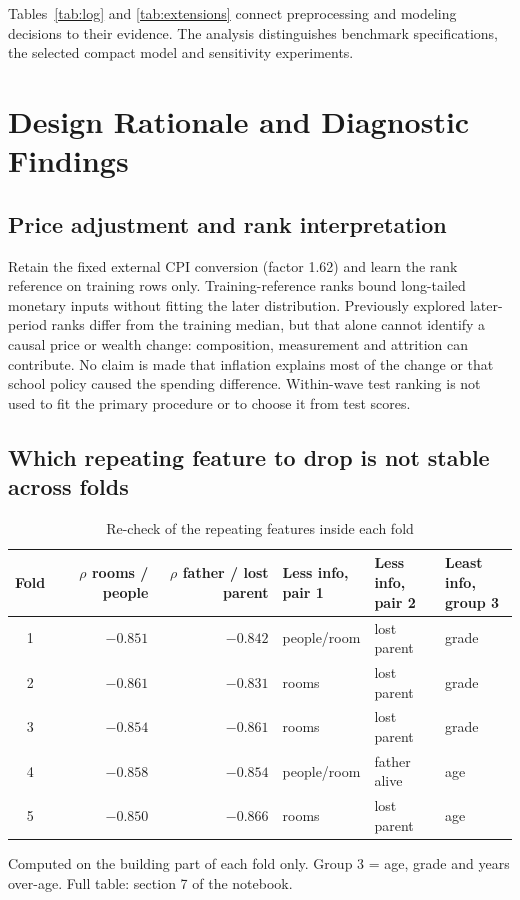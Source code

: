 \documentclass[conference,a4paper]{IEEEtran}
\newcommand{\tabnote}[1]{\par\vspace{3pt}\begin{minipage}{\linewidth}\footnotesize\raggedright #1\end{minipage}}
\begin{document}
Tables~\ref{tab:log} and \ref{tab:extensions} connect preprocessing and modeling decisions to their evidence. The analysis distinguishes benchmark specifications, the selected compact model and sensitivity experiments.

\section{\textbf{Design Rationale and Diagnostic Findings}}
\subsection{\textbf{Price adjustment and rank interpretation}}
Retain the fixed external CPI conversion (factor 1.62) and learn the rank reference on training rows only. Training-reference ranks bound long-tailed monetary inputs without fitting the later distribution. Previously explored later-period ranks differ from the training median, but that alone cannot identify a causal price or wealth change: composition, measurement and attrition can contribute. No claim is made that inflation explains most of the change or that school policy caused the spending difference. Within-wave test ranking is not used to fit the primary procedure or to choose it from test scores.

\subsection{\textbf{Which repeating feature to drop is not stable across folds}}
\begin{table}[!t]
\centering
\caption{Re-check of the repeating features inside each fold}
\label{tab:folds}
\footnotesize
\setlength{\tabcolsep}{3pt}
\begin{tabular}{crrlll}
\toprule
Fold & \makecell{$\rho$ rooms /\\people} & \makecell{$\rho$ father /\\lost parent} & \makecell[l]{Less info,\\pair 1} & \makecell[l]{Less info,\\pair 2} & \makecell[l]{Least info,\\group 3} \\
\midrule
1 & $-0.851$ & $-0.842$ & people/room & lost parent & grade \\
2 & $-0.861$ & $-0.831$ & rooms & lost parent & grade \\
3 & $-0.854$ & $-0.861$ & rooms & lost parent & grade \\
4 & $-0.858$ & $-0.854$ & people/room & father alive & age \\
5 & $-0.850$ & $-0.866$ & rooms & lost parent & age \\
\bottomrule
\end{tabular}
\tabnote{Computed on the building part of each fold only. Group 3 = age, grade and years over-age. Full table: section 7 of the notebook.}
\end{table}
\end{document}
